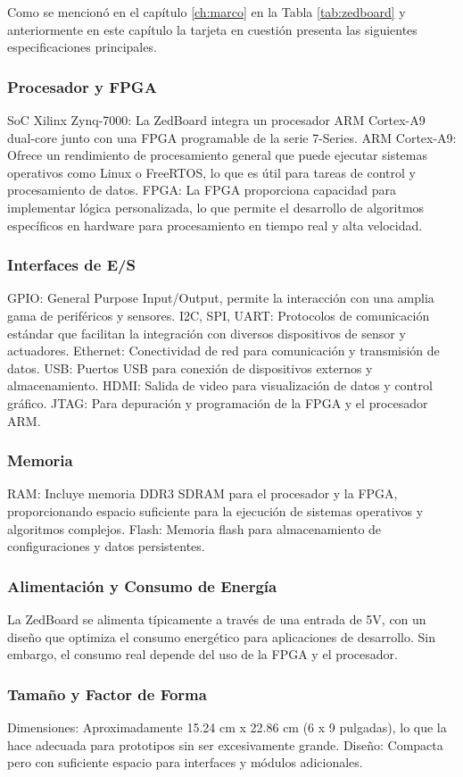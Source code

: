 Como se mencionó en el capítulo \ref{ch:marco} en la Tabla \ref{tab:zedboard} y anteriormente en este capítulo la tarjeta en cuestión presenta las siguientes especificaciones principales.

\subsubsection{Procesador y FPGA}
SoC Xilinx Zynq-7000: La ZedBoard integra un procesador ARM Cortex-A9 dual-core junto con una FPGA programable de la serie 7-Series.
ARM Cortex-A9: Ofrece un rendimiento de procesamiento general que puede ejecutar sistemas operativos como Linux o FreeRTOS, lo que es útil para tareas de control y procesamiento de datos.
FPGA: La FPGA proporciona capacidad para implementar lógica personalizada, lo que permite el desarrollo de algoritmos específicos en hardware para procesamiento en tiempo real y alta velocidad.
\subsubsection{Interfaces de E/S}
GPIO: General Purpose Input/Output, permite la interacción con una amplia gama de periféricos y sensores.
I2C, SPI, UART: Protocolos de comunicación estándar que facilitan la integración con diversos dispositivos de sensor y actuadores.
Ethernet: Conectividad de red para comunicación y transmisión de datos.
USB: Puertos USB para conexión de dispositivos externos y almacenamiento.
HDMI: Salida de video para visualización de datos y control gráfico.
JTAG: Para depuración y programación de la FPGA y el procesador ARM.
\subsubsection{Memoria}
RAM: Incluye memoria DDR3 SDRAM para el procesador y la FPGA, proporcionando espacio suficiente para la ejecución de sistemas operativos y algoritmos complejos.
Flash: Memoria flash para almacenamiento de configuraciones y datos persistentes.
\subsubsection{Alimentación y Consumo de Energía}
La ZedBoard se alimenta típicamente a través de una entrada de 5V, con un diseño que optimiza el consumo energético para aplicaciones de desarrollo. Sin embargo, el consumo real depende del uso de la FPGA y el procesador.
\subsubsection{Tamaño y Factor de Forma}
Dimensiones: Aproximadamente 15.24 cm x 22.86 cm (6 x 9 pulgadas), lo que la hace adecuada para prototipos sin ser excesivamente grande.
Diseño: Compacta pero con suficiente espacio para interfaces y módulos adicionales.
